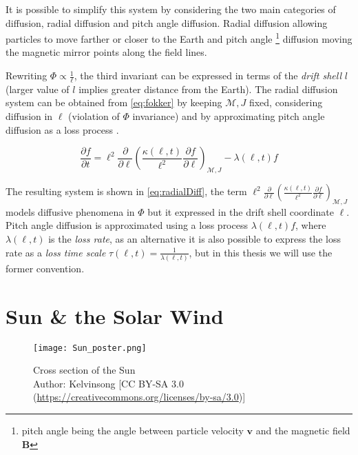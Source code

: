 It is possible to simplify this system by considering the two main categories of diffusion, radial diffusion and 
pitch angle diffusion. Radial diffusion allowing particles to move farther or closer to the Earth and pitch angle 
\footnote{pitch angle being the angle between particle velocity $\mathbf{v}$ and the magnetic field $\mathbf{B}$} 
diffusion moving the magnetic mirror points along the field lines.

Rewriting $\Phi \propto \frac{1}{\ell}$, the third invariant can be expressed in terms of the 
\emph{drift shell} $l$ (larger value of $l$ implies greater distance from the Earth). The radial diffusion system 
can be obtained from \ref{eq:fokker} by keeping $\mathcal{M}, J$ fixed, considering diffusion in $\ell$ 
(violation of $\Phi$ invariance) and by approximating pitch angle diffusion as a loss process 
\citep{roederer2012dynamics,Walt1970}.  

\begin{equation}\label{eq:radialDiff}
    \frac{\partial{f}}{\partial{t}} = \ell^2 \frac{\partial}{\partial{\ell}} \left( \frac{\kappa(\ell,
        t)}{\ell^{2}} \frac{\partial{f}}{\partial{\ell}}
    \right)_{\mathcal{M}, J} - \lambda(\ell,t) f
\end{equation}

The resulting system is shown in \ref{eq:radialDiff}, the term 
$\ell^2 \frac{\partial}{\partial{\ell}} \left( \frac{\kappa(\ell,t)}{\ell^{2}} \frac{\partial{f}}{\partial{\ell}}
\right)_{\mathcal{M}, J}$ models diffusive phenomena in $\Phi$ but it expressed in the drift shell coordinate $\ell$. 
Pitch angle diffusion is approximated using a loss process $\lambda(\ell,t) f$, where $\lambda(\ell,t)$ is the 
\emph{loss rate}, as an alternative it is also possible to express the loss rate as a \emph{loss time scale} 
$\tau(\ell,t) = \frac{1}{\lambda(\ell,t)}$, but in this thesis we will use the former convention.


\section{Sun \& the Solar Wind}\label{sec:solar}

\begin{figure}
    \noindent\centering\texttt{[image: Sun\_poster.png]}
    \caption{\small{Cross section of the Sun \\ 
    Author: Kelvinsong [CC BY-SA 3.0 (\url{https://creativecommons.org/licenses/by-sa/3.0})]}}
    \label{fig:SunLayers}
\end{figure}

